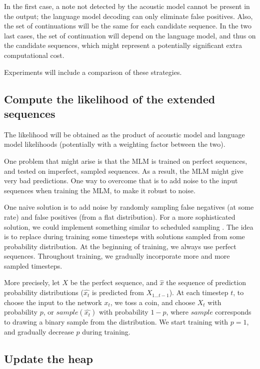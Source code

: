 \documentclass{article}
\begin{document}
In the first case, a note not detected by the acoustic model cannot be present in the output; the language model decoding can only eliminate false positives.
Also, the set of continuations will be the same for each candidate sequence.
In the two last cases, the set of continuation will depend on the language model, and thus on the candidate sequences, which might represent a potentially significant extra computational cost.

Experiments will include a comparison of these strategies.

\subsection{Compute the likelihood of the extended sequences}
\label{sec:schedsamp}

The likelihood will be obtained as the product of acoustic model and language model likelihoods (potentially with a weighting factor between the two).

One problem that might arise is that the MLM is trained on perfect sequences, and tested on imperfect, sampled sequences.
As a result, the MLM might give very bad predictions.
One way to overcome that is to add noise to the input sequences when training the MLM, to make it robust to noise.

One naive solution is to add noise by randomly sampling false negatives (at some rate) and false positives (from a flat distribution).
For a more sophisticated solution, we could implement something similar to scheduled sampling  \citep{Bengio2015}.
The idea is to replace during training some timesteps with solutions sampled from some probability distribution.
At the beginning of training, we always use perfect sequences.
Throughout training, we gradually incorporate more and more sampled timesteps.

More precisely, let $X$ be the perfect sequence, and $\hat{x}$ the sequence of prediction probability distributions
($\hat{x_t}$ is predicted from $X_{1...t-1}$).
At each timestep $t$, to choose the input to the network $x_t$, we toss a coin,
and choose $X_t$ with probability $p$, or $sample(\hat{x_t})$ with probability $1-p$, where $sample$ corresponds to drawing a binary sample from the distribution.
We start training with $p=1$, and gradually decrease $p$ during training.



\subsection{Update the heap}
\label{sec:update}
\end{document}
